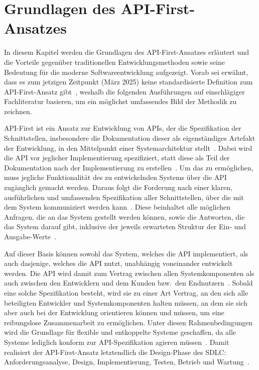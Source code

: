 \chapter{Grundlagen des API-First-Ansatzes}
In diesem Kapitel werden die Grundlagen des API-First-Ansatzes erläutert und die Vorteile gegenüber traditionellen Entwicklungsmethoden sowie seine Bedeutung für die moderne Softwareentwicklung aufgezeigt. Vorab sei erwähnt, dass es zum jetzigen Zeitpunkt (März 2025) keine standardisierte Definition zum API-First-Ansatz gibt~\autocite[77]{bea22}, weshalb die folgenden Ausführungen auf einschlägiger Fachliteratur basieren, um ein möglichst umfassendes Bild der Methodik zu zeichnen.

API-First ist ein Ansatz zur Entwicklung von \acp{API}, der die Spezifikation der Schnittstellen, insbesondere die Dokumentation dieser als eigenständiges Artefakt der Entwicklung, in den Mittelpunkt einer Systemarchitektur stellt~\autocite[2]{kul23}. Dabei wird die \ac{API} vor jeglicher Implementierung spezifiziert, statt diese als Teil der Dokumentation nach der Implementierung zu erstellen~\autocites[1627]{cha21}[349]{de23}. Um das zu ermöglichen, muss jegliche Funktionalität des zu entwickelnden Systems über die \ac{API} zugänglich gemacht werden. Daraus folgt die Forderung nach einer klaren, ausführlichen und umfassenden Spezifikation aller Schnittstellen, über die mit dem System kommuniziert werden kann~\autocite[75]{bea22}. Diese beinhaltet alle möglichen Anfragen, die an das System gestellt werden können, sowie die Antworten, die das System darauf gibt, inklusive der jeweils erwarteten Struktur der Ein- und Ausgabe-Werte~\autocite[350]{de23}.

Auf dieser Basis können sowohl das System, welches die \ac{API} implementiert, als auch dasjenige, welches die \ac{API} nutzt, unabhängig voneinander entwickelt werden.
Die \ac{API} wird damit zum Vertrag zwischen allen Systemkomponenten als auch zwischen den Entwicklern und dem Kunden bzw.\ den Endnutzern~\autocite[1627]{cha21}. Sobald eine solche Spezifikation besteht, wird sie zu einer Art Vertrag, an den sich alle beteiligten Entwickler und Systemkomponenten halten müssen, an dem sie sich aber auch bei der Entwicklung orientieren können und müssen, um eine reibungslose Zusammenarbeit zu ermöglichen. Unter diesen Rahmenbedingungen wird die Grundlage für flexible und entkoppelte Systeme geschaffen, da alle Systeme lediglich konform zur \ac{API}-Spezifikation agieren müssen~\autocite[350,354,360]{de23}.
Damit realisiert der API-First-Ansatz letztendlich die Design-Phase des \ac{SDLC}: Anforderungsanalyse, Design, Implementierung, Testen, Betrieb und Wartung~\autocite{vol22}.

